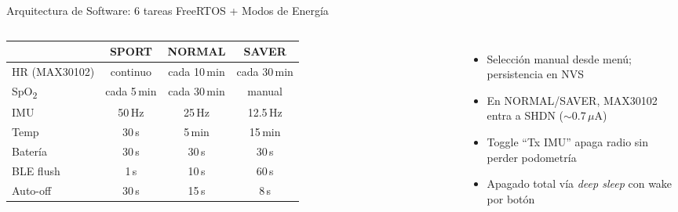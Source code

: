 \documentclass[aspectratio=169, 10pt]{beamer}
\begin{document}
\begin{frame}{Arquitectura de Software: 6 tareas FreeRTOS + Modos de Energ\'ia}
\begin{columns}[T]
        \scriptsize
        \begin{tabular}{l c c c}
            \toprule
             & \textbf{SPORT} & \textbf{NORMAL} & \textbf{SAVER} \\
            \midrule
            HR (MAX30102)    & continuo & cada 10\,min & cada 30\,min \\
            SpO\textsubscript{2}      & cada 5\,min & cada 30\,min & manual \\
            IMU              & 50\,Hz & 25\,Hz & 12.5\,Hz \\
            Temp             & 30\,s & 5\,min & 15\,min \\
            Bater\'ia        & 30\,s & 30\,s & 30\,s \\
            BLE flush        & 1\,s & 10\,s & 60\,s \\
            Auto-off         & 30\,s & 15\,s & 8\,s \\
            \bottomrule
        \end{tabular}
        \vspace{0.2cm}
        \begin{itemize}
            \item Selecci\'on manual desde men\'u; persistencia en NVS
            \item En NORMAL/SAVER, MAX30102 entra a SHDN ($\sim$0.7\,$\mu$A)
            \item Toggle ``Tx IMU'' apaga radio sin perder podometr\'ia
            \item Apagado total v\'ia \textit{deep sleep} con wake por bot\'on
        \end{itemize}
    \end{columns}
\end{frame}
\end{document}
